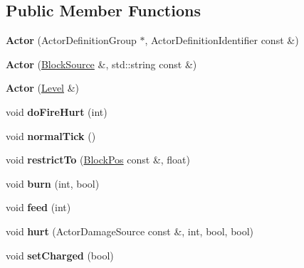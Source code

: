 \subsection*{Public Member Functions}
\begin{DoxyCompactItemize}
\item 
\mbox{\label{struct_actor_aa761166bbd43ebf6fb4477519f13a1dd}} 
{\bfseries Actor} (Actor\+Definition\+Group $\ast$, Actor\+Definition\+Identifier const \&)
\item 
\mbox{\label{struct_actor_a926a8218bde79de2c09600226f0c6578}} 
{\bfseries Actor} (\mbox{\hyperlink{struct_block_source}{Block\+Source}} \&, std\+::string const \&)
\item 
\mbox{\label{struct_actor_a26df548a377b2f8508a0373995a77663}} 
{\bfseries Actor} (\mbox{\hyperlink{struct_level}{Level}} \&)
\item 
\mbox{\label{struct_actor_ac16e24c2e584493b446bf604372a112b}} 
void {\bfseries do\+Fire\+Hurt} (int)
\item 
\mbox{\label{struct_actor_a633ed1bcd23403a9cb5d8d7ebaae0e48}} 
void {\bfseries normal\+Tick} ()
\item 
\mbox{\label{struct_actor_a8c23e3242ac61da9a85bd772eebf768f}} 
void {\bfseries restrict\+To} (\mbox{\hyperlink{struct_block_pos}{Block\+Pos}} const \&, float)
\item 
\mbox{\label{struct_actor_a29be96f42a7c5a136a14d946e17d502a}} 
void {\bfseries burn} (int, bool)
\item 
\mbox{\label{struct_actor_a2bc163f40b39584d1f2f94f345df1d80}} 
void {\bfseries feed} (int)
\item 
\mbox{\label{struct_actor_a1733f47a912d906d64c4173de14eedfd}} 
void {\bfseries hurt} (Actor\+Damage\+Source const \&, int, bool, bool)
\item 
\mbox{\label{struct_actor_a999fd1fb628c8d80232a53b75ce417f4}} 
void {\bfseries set\+Charged} (bool)
\item 

\end{DoxyCompactItemize}
